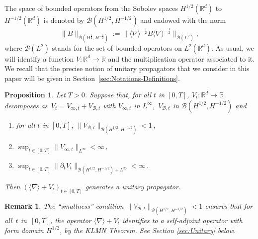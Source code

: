 \documentclass[12pt]{article}
\newcommand{\jnabla}{{\langle\nabla\rangle}}
\theoremstyle{plain}
\newtheorem{prop}[theo]{Proposition}
\newtheorem{rem}[theo]{Remark}
\begin{document}
The space of bounded operators from the Sobolev spaces $H^{1/2}(\mathbb{R}^d)$ to $H^{-1/2}(\mathbb{R}^d)$ is denoted by $\mathcal{B}(H^{1/2},H^{-1/2})$ and endowed with the norm
\begin{equation*}
    \|B\|_{\mathcal{B}(H^{\frac12},H^{-\frac12})}:=\big\|\jnabla^{-\frac12}B\jnabla^{-\frac12}\big\|_{\mathcal{B}(L^2)},
\end{equation*}
where ${\mathcal{B}(L^2)}$ stands for the set of bounded operators on $L^2(\mathbb{R}^d)$. 
As usual, we will identify a function $V:\mathbb{R}^d\to\mathbb{R}$ and the multiplication operator associated to it. 
We recall that the precise notion of unitary propagators that we consider in this paper will be given in Section~\ref{sec:Notations-Definitions}.
\begin{prop}\label{cor:existence-unitary-propagator-for-time-dependent-potential}
Let $T>0$.
Suppose that, for all $t$ in $[0,T]$, $V_t:\mathbb{R}^d\to\mathbb{R}$ decomposes as~$V_t=V_{\infty,t}+V_{\mathcal{B},t}$ with $V_{\infty,t}$ in $L^\infty$,~$V_{\mathcal{B},t}$ in $\mathcal{B}(H^{1/2},H^{-1/2})$ and
\begin{enumerate}
    \item \label{item:borne-Vd} for all $t$ in $[0,T]$,  $\|V_{\mathcal{B},t}\|_{\mathcal{B}(H^{1/2},H^{-1/2})} <1$\,, 
    \item \label{item:borne-Vinfty} $\sup_{t\in [0,T]}\|V_{\infty,t}\|_{L^\infty}<\infty$\,,
    \item \label{item:borne-dtV}$ \sup_{t\in [0,T]}\|\partial_t V_t\|_{\mathcal{B}(H^{1/2},H^{-1/2})+L^\infty} < \infty$\,.
\end{enumerate}
Then $(\jnabla+V_t)_{t\in[0,T]}$ generates a unitary propagator.
\end{prop}

\begin{rem}
The ``smallness'' condition $\|V_{\mathcal{B},t}\|_{\mathcal{B}(H^{1/2},H^{-1/2})} <1$ ensures that for all~$t$ in~$[0,T]$, the operator $\jnabla + V_t$ identifies to a self-adjoint operator with form domain $H^{1/2}$, by the KLMN Theorem. See Section \ref{sec:Unitary} below.
\end{rem}
\end{document}
